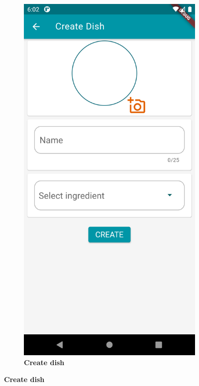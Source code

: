 \documentclass [12pt]{article}
\begin{document}
\begin{description}[leftmargin=1cm,rightmargin=1cm]
\begin{figure}[h!]
\begin{subfigure}[tr]{0.3\linewidth}
\includegraphics[width=\linewidth]{addDish2.PNG}
\caption{\textbf{Create dish}}
\end{subfigure}

\end{figure}
\end{description}
\end{document}
